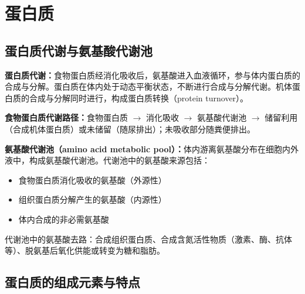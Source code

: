 \chapter{蛋白质}

\section{蛋白质代谢与氨基酸代谢池}

\begin{tipbox}
\textbf{蛋白质代谢：}食物蛋白质经消化吸收后，氨基酸进入血液循环，参与体内蛋白质的合成与分解。蛋白质在体内处于动态平衡状态，不断进行合成与分解代谢。机体蛋白质的合成与分解同时进行，构成蛋白质转换（protein turnover）。

\textbf{食物蛋白质代谢路径：}食物蛋白质 $\rightarrow$ 消化吸收 $\rightarrow$ 氨基酸代谢池 $\rightarrow$ 储留利用（合成机体蛋白质）或未储留（随尿排出）；未吸收部分随粪便排出。

\textbf{氨基酸代谢池（amino acid metabolic pool）：}体内游离氨基酸分布在细胞内外液中，构成氨基酸代谢池。代谢池中的氨基酸来源包括：
\begin{itemize}[leftmargin=*]
    \item 食物蛋白质消化吸收的氨基酸（外源性）
    \item 组织蛋白质分解产生的氨基酸（内源性）
    \item 体内合成的非必需氨基酸
\end{itemize}
代谢池中的氨基酸去路：合成组织蛋白质、合成含氮活性物质（激素、酶、抗体等）、脱氨基后氧化供能或转变为糖和脂肪。
\end{tipbox}

\section{蛋白质的组成元素与特点}

